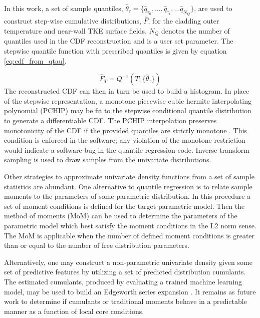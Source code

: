 In this work, a set of sample quantiles, $\hat \theta_\tau = \{\hat q_{\tau_0}, \dots, \hat q_{\tau_i}, \dots \hat q_{N_Q} \}$, are used to construct step-wise cumulative distributions, $\hat F$, for the cladding outer temperature and near-wall TKE surface fields.  $N_Q$ denotes the number of quantiles used in the CDF reconstruction and is a user set parameter. The stepwise quantile function with prescribed quantiles is given by equation \ref{eq:cdf_from_qtau}.

\begin{equation}
\hat F_{T}= Q^{-1}(T; \{\hat{\theta}_{\tau} \})
\label{eq:cdf_from_qtau}
\end{equation}
The reconstructed CDF can then in turn be used to build a histogram.  In place of the stepwise representation, a monotone piecewise cubic hermite interpolating polynomial (PCHIP) may be fit to the stepwise conditional quantile distribution to generate a differentiable CDF.
The PCHIP interpolation preserves monotonicity of the CDF if the provided quantiles are strictly monotone \cite{Fritsch80}.  This condition is enforced in the software; any violation of the monotone restriction would indicate a software bug in the quantile regression code.  Inverse transform sampling is used to draw samples from the univariate distributions.

Other strategies to approximate univariate density functions from a set of sample statistics are abundant.  One alternative to quantile regression is to relate sample moments to the parameters of some parametric distribution.  In this procedure a set of moment conditions is defined for the target parametric model.  Then the method of moments (MoM) can be used to determine the parameters of the parametric model which best satisfy the moment conditions in the L2 norm sense.  The MoM is applicable when the number of defined moment conditions is greater than or equal to the number of free distribution parameters.

Alternatively, one may construct a non-parametric univariate density given some set of predictive features by utilizing a set of predicted distribution cumulants.  The estimated cumulants, produced by evaluating a trained machine learning model, may be used to build an Edgeworth series expansion \cite{hall1997}.  It remains as future work to determine if cumulants or traditional moments behave in a predictable manner as a function of local core conditions.

